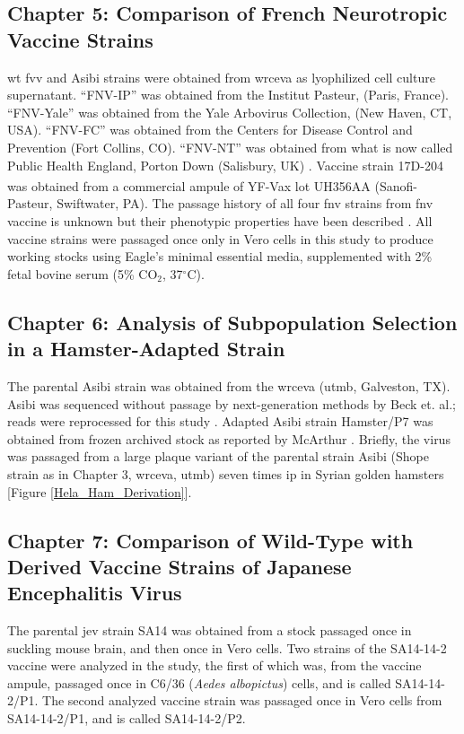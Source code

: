 \subsection{Chapter 5: Comparison of French Neurotropic Vaccine Strains}
\Gls{wt} \gls{fvv} and Asibi strains were obtained from \gls{wrceva} as lyophilized cell culture supernatant. “FNV-IP” was obtained from the Institut Pasteur, (Paris, France). “FNV-Yale” was obtained from the Yale Arbovirus Collection, (New Haven, CT, USA).  “FNV-FC” was obtained from the Centers for Disease Control and Prevention (Fort Collins, CO). “FNV-NT” was obtained from what is now called Public Health England, Porton Down (Salisbury, UK) \parencite{Fitzgeorge:1980vl}. Vaccine strain 17D-204 was obtained from a commercial ampule of YF-Vax\textsuperscript{\textregistered} lot UH356AA (Sanofi-Pasteur, Swiftwater, PA). The passage history of all four \gls{fnv} strains from \gls{fnv} vaccine is unknown but their phenotypic properties have been described \parencite{Wang:1995vu}. All vaccine strains were passaged once only in Vero cells in this study to produce working stocks using Eagle’s minimal essential media, supplemented with 2\% fetal bovine serum (5\% CO$_2$, 37$^{\circ}$C).
\subsection{Chapter 6: Analysis of Subpopulation Selection in a Hamster-Adapted Strain}
The parental Asibi strain was obtained from the \gls{wrceva} (\gls{utmb}, Galveston, TX). Asibi was sequenced without passage by next-generation methods by Beck et. al.; reads were reprocessed for this study \parencite{Beck:2014cm}. Adapted Asibi strain Hamster/P7 was obtained from frozen archived stock as reported by McArthur \parencite{McArthur:2003fv}. Briefly, the virus was passaged from a large plaque variant of the parental strain Asibi (Shope strain as in Chapter 3, \gls{wrceva}, \gls{utmb}) seven times \gls{ip} in Syrian golden hamsters [Figure \ref{Hela_Ham_Derivation}].
\subsection{Chapter 7: Comparison of Wild-Type with Derived Vaccine Strains of Japanese Encephalitis Virus}
The parental \gls{jev} strain SA14 was obtained from a stock passaged once in suckling mouse brain, and then once in Vero cells. Two strains of the SA14-14-2 vaccine were analyzed in the study, the first of which was, from the vaccine ampule, passaged once in C6/36 (\emph{Aedes albopictus}) cells, and is called SA14-14-2/P1. The second analyzed vaccine strain was passaged once in Vero cells from SA14-14-2/P1, and is called SA14-14-2/P2.

